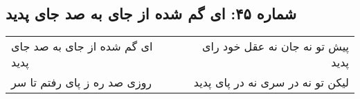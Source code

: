 \begin{center}
\section*{شماره ۴۵: ای گم شده از جای به صد جای پدید}
\label{sec:045}
\begin{longtable}{l p{0.5cm} r}
ای گم شده از جای به صد جای پدید
&&
پیش تو نه جان نه عقل خود رای پدید
\\
روزی صد ره ز پای رفتم تا سر
&&
لیکن تو نه در سری نه در پای پدید
\\
\end{longtable}
\end{center}
